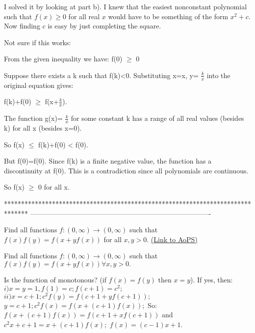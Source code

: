 \begin{mysolution}
	I solved it by looking at part b). I knew that the easiest nonconstant polynomial such that $f(x) \ge 0$ for all real $x$ would have to be something of the form $x^2 +c$. Now finding $c$ is easy by just completing the square.
\end{mysolution}



\begin{mysolution}
	Not sure if this works:

From the given inequality we have:
f(0) $\geq$ 0

Suppose there exists a k such that f(k)<0.
Substituting x=x, y= $\frac{k}{x}$ into the original equation gives:

f(k)+f(0) $\geq$ f(x+$\frac{k}{x}$).

The function g(x)= $\frac{k}{x}$ for some constant k has a range of all real values (besides k) for all x (besides x=0).

So f(x) $\leq$ f(k)+f(0) < f(0).

But f(0)=f(0). Since f(k) is a finite negative value, the function has a discontinuity at f(0). This is a contradiction since all polynomials are continuous.

So f(x) $\geq$ 0 for all x.
\end{mysolution}
*******************************************************************************
-------------------------------------------------------------------------------

\begin{problem}
	Find all functions $ f: (0,\infty)\to (0,\infty)$ such that $ f(x)f(y)=f(x+yf(x))$ for all $x,y>0$.
	\flushright \href{https://artofproblemsolving.com/community/c6h160911}{(Link to AoPS)}
\end{problem}



\begin{mysolution}
	\begin{tcolorbox}Find all functions $ f: (0,\infty)\to (0,\infty)$ such that $ f(x)f(y)=f(x+yf(x))\forall x,y>0.$\end{tcolorbox}
Is the function of monotonous? (if $ f(x)=f(y)$ then $ x=y$).
If yes, then:
$ i) x=y=1, f(1)=c; f(c+1)=c^{2};$
$ ii) x=c+1; c^{2}f(y)=f(c+1+yf(c+1));$
$ y=c+1; c^{2}f(x)=f(x+(c+1)f(x));$
So: $ f(x+(c+1)f(x))=f(c+1+xf(c+1))$ and $ c^{2}x+c+1=x+(c+1)f(x);$
$ f(x)=(c-1)x+1.$
\end{mysolution}




